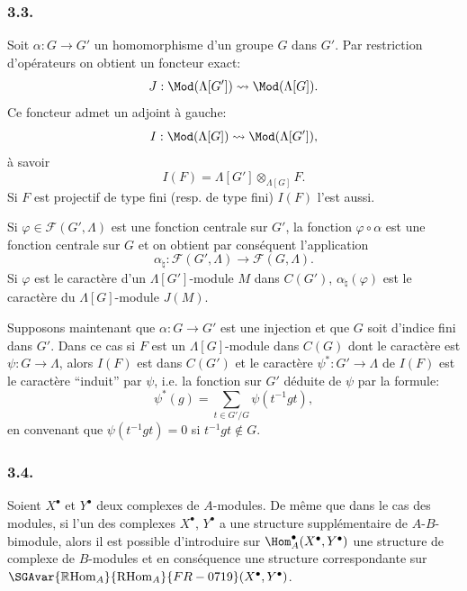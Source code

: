 \subsubsection*{3.3.}

Soit $\alpha:G\to G'$ un homomorphisme d'un groupe $G$ dans $G'$. Par restriction d'opérateurs on obtient un foncteur exact:
\[
J:\Mod(\Lambda[G'])\rightsquigarrow\Mod(\Lambda[G]).
\]
Ce foncteur admet un adjoint à gauche:
\[
I:\Mod(\Lambda[G])\rightsquigarrow\Mod(\Lambda[G']),
\]
à savoir
\[
I(F)=\Lambda[G']\otimes_{\Lambda[G]}F.
\]
Si $F$ est projectif de type fini (resp. de type fini) $I(F)$ l'est aussi.

Si $\varphi\in\mathcal{F}(G',\Lambda)$ est une fonction centrale sur $G'$, la fonction $\varphi\circ\alpha$ est une fonction centrale sur $G$ et on obtient par conséquent l'application
\[
\alpha_\natural: \mathcal{F}(G',\Lambda)\longrightarrow\mathcal{F}(G,\Lambda).
\]
Si $\varphi$ est le caractère d'un $\Lambda[G']$-module $M$ dans $C(G')$, $\alpha_\natural(\varphi)$ est le caractère du $\Lambda[G]$-module $J(M)$.

Supposons maintenant que $\alpha:G\to G'$ est une injection et que $G$ soit d'indice fini dans $G'$. Dans ce cas si $F$ est un $\Lambda[G]$-module dans $C(G)$ dont le caractère est $\psi:G\to\Lambda$, alors $I(F)$ est dans $C(G')$ et le caractère $\psi^*:G'\to\Lambda$ de $I(F)$ est le caractère ``induit'' par $\psi$, i.e. la fonction sur $G'$ déduite de $\psi$ par la formule:
\[
\psi^*(g)=\sum_{t\in G'/G}\psi(t^{-1}gt),
\tag{3.3.1}
\]
en
convenant que $\psi(t^{-1}gt)=0$ si $t^{-1}gt\notin G$.

\subsubsection*{3.4.}

Soient $X^\bullet$ et $Y^\bullet$ deux complexes de $A$-modules. De même que dans le cas des modules, si l'un des complexes $X^\bullet$, $Y^\bullet$ a une structure supplémentaire de $A$-$B$-bimodule, alors il est possible d'introduire sur $\Hom_A^\bullet(X^\bullet,Y^\bullet)$ une structure de complexe de $B$-modules et en conséquence une structure correspondante sur $\SGAvar{\mathbb{R}\mathrm{Hom}_A}{\mathrm{RHom}_A}{FR-0719}(X^\bullet,Y^\bullet)$.

